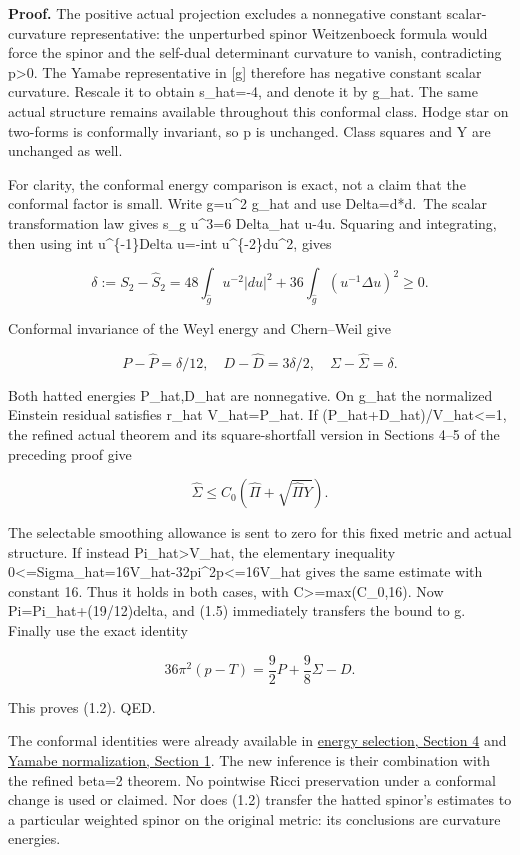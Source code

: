 \documentclass[
  10pt,
]{article}
\begin{document}
\textbf{Proof.} The positive actual projection excludes a nonnegative
constant scalar-curvature representative: the unperturbed spinor
Weitzenboeck formula would force the spinor and the self-dual
determinant curvature to vanish, contradicting p\textgreater0. The
Yamabe representative in {[}g{]} therefore has negative constant scalar
curvature. Rescale it to obtain s\_hat=-4, and denote it by g\_hat. The
same actual structure remains available throughout this conformal class.
Hodge star on two-forms is conformally invariant, so p is unchanged.
Class squares and Y are unchanged as well.

For clarity, the conformal energy comparison is exact, not a claim that
the conformal factor is small. Write g=u\^{}2 g\_hat and use
Delta=d*d.~The scalar transformation law gives s\_g u\^{}3=6 Delta\_hat
u-4u. Squaring and integrating, then using int u\^{}\{-1\}Delta u=-int
u\^{}\{-2\}\textbar du\textbar\^{}2, gives

\[
 \delta:=S_2-\widehat S_2
 =48\int_{\widehat g}u^{-2}|du|^2
       +36\int_{\widehat g}(u^{-1}\Delta u)^2\ge0.        \tag{1.4}
\]

Conformal invariance of the Weyl energy and Chern--Weil give

\[
 P-\widehat P=\delta/12,\quad
 D-\widehat D=3\delta/2,\quad
 \Sigma-\widehat\Sigma=\delta.                          \tag{1.5}
\]

Both hatted energies P\_hat,D\_hat are nonnegative. On g\_hat the
normalized Einstein residual satisfies r\_hat V\_hat=P\_hat. If
(P\_hat+D\_hat)/V\_hat\textless=1, the refined actual theorem and its
square-shortfall version in Sections 4--5 of the preceding proof give

\[
 \widehat\Sigma\le C_0\left(\widehat\Pi+
                             \sqrt{\widehat\Pi Y}\right).
\]

The selectable smoothing allowance is sent to zero for this fixed metric
and actual structure. If instead Pi\_hat\textgreater V\_hat, the
elementary inequality
0\textless=Sigma\_hat=16V\_hat-32pi\^{}2p\textless=16V\_hat gives the
same estimate with constant 16. Thus it holds in both cases, with
C\textgreater=max(C\_0,16). Now Pi=Pi\_hat+(19/12)delta, and (1.5)
immediately transfers the bound to g. Finally use the exact identity

\[
 36\pi^2(p-T)=\frac92P+\frac98\Sigma-D.                 \tag{1.6}
\]

This proves (1.2). QED.

The conformal identities were already available in
\href{../mathematics/current/line1_energy_selection.md}{energy
selection, Section 4} and
\href{../mathematics/current/line1_yamabe_endpoint.md}{Yamabe
normalization, Section 1}. The new inference is their combination with
the refined beta=2 theorem. No pointwise Ricci preservation under a
conformal change is used or claimed. Nor does (1.2) transfer the hatted
spinor's estimates to a particular weighted spinor on the original
metric: its conclusions are curvature energies.
\end{document}
